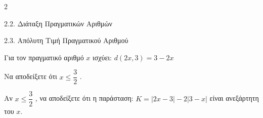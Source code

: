 \begin{ylh}{2}
    \item 2.2. Διάταξη Πραγματικών Αριθμών
    \item 2.3. Απόλυτη Τιμή Πραγματικού Αριθμού
\end{ylh}
Για τον πραγματικό αριθμό $x$ ισχύει: $d(2x,3) = 3 - 2x$
\begin{alist}
\item Να αποδείξετε ότι $x \leq \dfrac{3}{2}$ .
\item Αν $x \leq \dfrac{3}{2}$ , να αποδείξετε ότι η παράσταση: $K = |2x - 3| - 2|3 - x|$ είναι ανεξάρτητη του $x$.
\end{alist}

